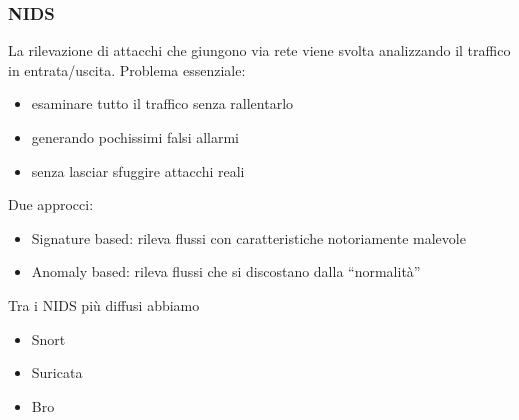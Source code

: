 \documentclass[aspectratio=169]{beamer}
\begin{document}
    
	\begin{frame}
		\frametitle{NIDS}
        La rilevazione di attacchi che giungono via rete viene svolta analizzando il traffico in entrata/uscita.
        Problema essenziale:
        \begin{itemize}
            \item esaminare tutto il traffico senza rallentarlo
            \item generando pochissimi falsi allarmi
            \item senza lasciar sfuggire attacchi reali
        \end{itemize}
        
        Due approcci:
        \begin{itemize}
            \item Signature based: rileva flussi con caratteristiche notoriamente
        malevole
            \item Anomaly based: rileva flussi che si discostano dalla “normalità”
        \end{itemize}
        
        Tra i NIDS più diffusi abbiamo
        \begin{itemize}
            \item Snort
            \item Suricata
            \item Bro
        \end{itemize}
	\end{frame}
	
\end{document}
